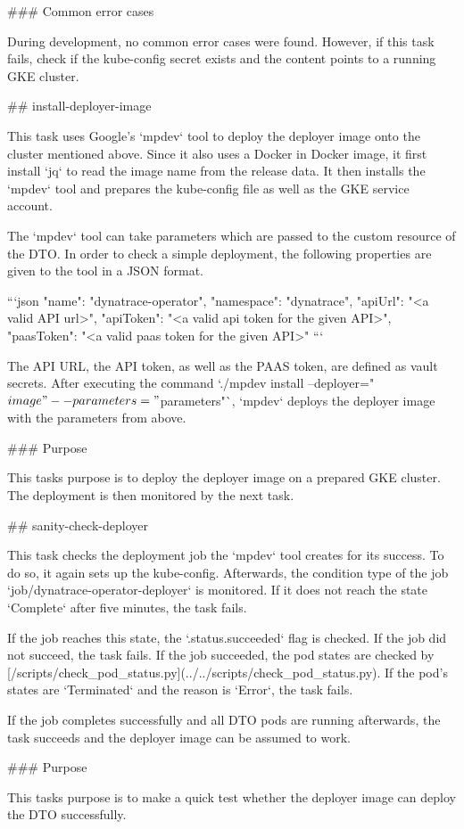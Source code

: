 ### Common error cases

During development, no common error cases were found.
However, if this task fails, check if the kube-config secret exists and the content points to a running GKE cluster.

## install-deployer-image

This task uses Google's `mpdev` tool to deploy the deployer image onto the cluster mentioned above.
Since it also uses a Docker in Docker image, it first install `jq` to read the image name from the release data.
It then installs the `mpdev` tool and prepares the kube-config file as well as the GKE service account.

The `mpdev` tool can take parameters which are passed to the custom resource of the DTO.
In order to check a simple deployment, the following properties are given to the tool in a JSON format.

```json
    {
    "name": "dynatrace-operator",
    "namespace": "dynatrace",
    "apiUrl": "<a valid API url>",
    "apiToken": "<a valid api token for the given API>",
    "paasToken": "<a valid paas token for the given API>"
}
```

The API URL, the API token, as well as the PAAS token, are defined as vault secrets.
After executing the command `./mpdev install --deployer="${image}" --parameters="${parameters}"`, `mpdev` deploys the deployer image with the parameters from above.

### Purpose

This tasks purpose is to deploy the deployer image on a prepared GKE cluster.
The deployment is then monitored by the next task.

## sanity-check-deployer

This task checks the deployment job the `mpdev` tool creates for its success.
To do so, it again sets up the kube-config.
Afterwards, the condition type of the job `job/dynatrace-operator-deployer` is monitored.
If it does not reach the state `Complete` after five minutes, the task fails.

If the job reaches this state, the `.status.succeeded` flag is checked.
If the job did not succeed, the task fails.
If the job succeeded, the pod states are checked by [/scripts/check_pod_status.py](../../scripts/check_pod_status.py).
If the pod's states are `Terminated` and the reason is `Error`, the task fails.

If the job completes successfully and all DTO pods are running afterwards, the task succeeds and the deployer image can be assumed to work.

### Purpose

This tasks purpose is to make a quick test whether the deployer image can deploy the DTO successfully.
